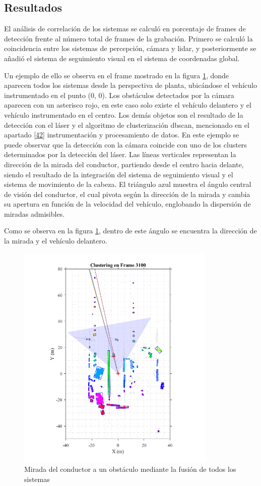\subsection{Resultados }\label{442}
El análisis de correlación de los sistemas se calculó en porcentaje de frames de detección frente al número total de frames de la grabación. Primero se calculó la coincidencia entre los sistemas de percepción, cámara y \gls{lidar}, y posteriormente se añadió el sistema de seguimiento visual en el sistema de coordenadas global. 

Un ejemplo de ello se observa en el frame mostrado en la figura \ref{fig:4.14}, donde aparecen todos los sistemas desde la perspectiva de planta, ubicándose el vehículo instrumentado en el punto (0, 0). Los obstáculos detectados por la cámara aparecen con un asterisco rojo, en este caso solo existe el vehículo delantero y el vehículo instrumentado en el centro. Los demás objetos son el resultado de la detección con el láser y el algoritmo de clusterización \gls{dbscan}, mencionado en el apartado \ref{42} instrumentación y procesamiento de datos. En este ejemplo se puede observar que la detección con la cámara coincide con uno de los clusters determinados por la detección del láser. Las líneas verticales representan la dirección de la mirada del conductor, partiendo desde el centro hacia delante, siendo el resultado de la integración del sistema de seguimiento visual y el sistema de movimiento de la cabeza. El triángulo azul muestra el ángulo central de visión del conductor, el cual pivota según la dirección de la mirada y cambia su apertura en función de la velocidad del vehículo, englobando la dispersión de miradas admisibles.

Como se observa en la figura \ref{fig:4.14}, dentro de este ángulo se encuentra la dirección de la mirada y el vehículo delantero.

\vspace{-20pt}
\begin{figure}[h]
    \centering
    \includegraphics[width=9.5cm]
    {figures/4.14.png}
    \caption{ \label{fig:4.14} Mirada del conductor a un obstáculo mediante la fusión de todos los sistemas}
\end{figure}

